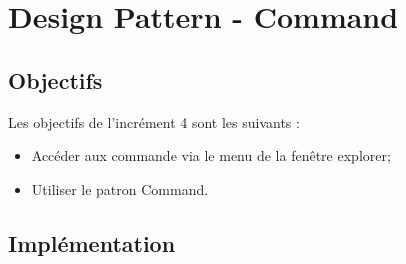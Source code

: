 
\newpage
\section{Design Pattern - Command}

\subsection{Objectifs}

Les objectifs de l'incrément 4 sont les suivants :\\
\begin{itemize}
\item Accéder aux commande via le menu de la fenêtre explorer;
\item Utiliser le patron Command.\\
\end{itemize}

\subsection{Implémentation}